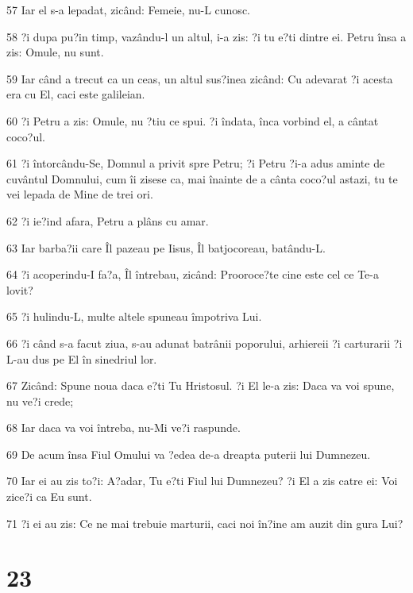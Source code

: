 \par 57 Iar el s-a lepadat, zicând: Femeie, nu-L cunosc.
\par 58 ?i dupa pu?in timp, vazându-l un altul, i-a zis: ?i tu e?ti dintre ei. Petru însa a zis: Omule, nu sunt.
\par 59 Iar când a trecut ca un ceas, un altul sus?inea zicând: Cu adevarat ?i acesta era cu El, caci este galileian.
\par 60 ?i Petru a zis: Omule, nu ?tiu ce spui. ?i îndata, înca vorbind el, a cântat coco?ul.
\par 61 ?i întorcându-Se, Domnul a privit spre Petru; ?i Petru ?i-a adus aminte de cuvântul Domnului, cum îi zisese ca, mai înainte de a cânta coco?ul astazi, tu te vei lepada de Mine de trei ori.
\par 62 ?i ie?ind afara, Petru a plâns cu amar.
\par 63 Iar barba?ii care Îl pazeau pe Iisus, Îl batjocoreau, batându-L.
\par 64 ?i acoperindu-I fa?a, Îl întrebau, zicând: Prooroce?te cine este cel ce Te-a lovit?
\par 65 ?i hulindu-L, multe altele spuneau împotriva Lui.
\par 66 ?i când s-a facut ziua, s-au adunat batrânii poporului, arhiereii ?i carturarii ?i L-au dus pe El în sinedriul lor.
\par 67 Zicând: Spune noua daca e?ti Tu Hristosul. ?i El le-a zis: Daca va voi spune, nu ve?i crede;
\par 68 Iar daca va voi întreba, nu-Mi ve?i raspunde.
\par 69 De acum însa Fiul Omului va ?edea de-a dreapta puterii lui Dumnezeu.
\par 70 Iar ei au zis to?i: A?adar, Tu e?ti Fiul lui Dumnezeu? ?i El a zis catre ei: Voi zice?i ca Eu sunt.
\par 71 ?i ei au zis: Ce ne mai trebuie marturii, caci noi în?ine am auzit din gura Lui?

\chapter{23}

